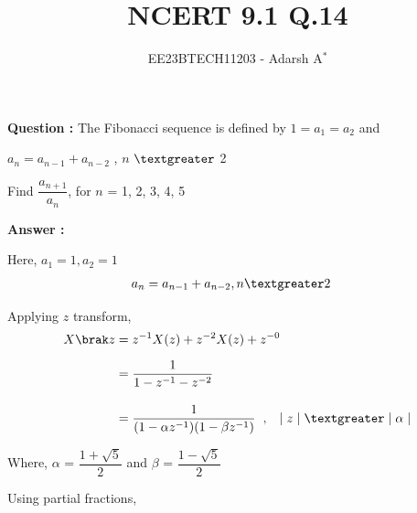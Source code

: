 \documentclass[journal,12pt,twocolumn]{IEEEtran}
\theoremstyle{remark}
\begin{document}
	
	
	\vspace{3cm}
	
	\title{NCERT 9.1 Q.14}
	\author{EE23BTECH11203 - Adarsh A$^{*}$%
	}
	\maketitle
	\bigskip
	
	\renewcommand{\thefigure}{\theenumi}
	\renewcommand{\thetable}{\theenumi}

	\linespread{1.1}
	
	
	\textbf{Question : }
	The Fibonacci sequence is defined by $1 = a_1 = a_2$ and \par $a_n = a_{n-1} + a_{n-2}$ , $n$ $\textgreater$ 2
	
	Find $\dfrac{a_{n + 1}}{a_n}$, for $n$ = 1, 2, 3, 4, 5
	
	\textbf{Answer : }
	\fi
	
	
	Here, $a_1 = 1, a_2 = 1$
	\begin{align}
	a_n &= a_{n-1} + a_{n-2} , n \textgreater 2
	\end{align}
	
	Applying $z$ transform,
	\begin{align}
		X\brak z	&= z^{-1} X(z) + z^{-2} X(z) + z^{-0}  \\[6pt]
		&= \dfrac{1}{1 - z^{-1} - z^{-2}}  \\[10pt]
		&= \dfrac{1}{(1 - \alpha z^{-1})(1 - \beta z^{-1})} \hspace{0.2cm}, \hspace{0.3cm}\lvert \hspace{0.1cm} z \hspace{0.1cm}\rvert \hspace{0.1cm} \textgreater \hspace{0.1cm} \lvert \hspace{0.1cm} \alpha \hspace{0.1cm} \rvert 				
	\end{align}

	Where, $\alpha$ = $\dfrac{1 +\sqrt{5}}{2}$ and $\beta$ = $\dfrac{1 -\sqrt{5}}{2}$ 

	Using partial fractions,
	
\end{document}
